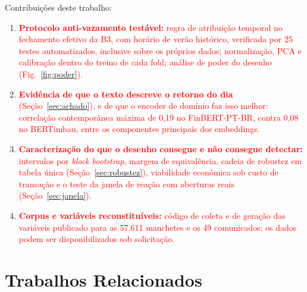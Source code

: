 \documentclass[conference]{IEEEtran}
\newcommand{\novo}[1]{\textcolor{red}{#1}}
\begin{document}
Contribui\c{c}\~oes deste trabalho:
\begin{enumerate}[\IEEEsetlabelwidth{(iii)}\renewcommand{\labelenumi}{\novo{(\roman{enumi})}}]
\item \novo{\textbf{Protocolo anti-vazamento test\'avel:} regra de atribui\c{c}\~ao temporal no fechamento efetivo da B3, com hor\'ario de ver\~ao hist\'orico, verificada por 25 testes automatizados, inclusive sobre os pr\'oprios dados; normaliza\c{c}\~ao, PCA e calibra\c{c}\~ao dentro do treino de cada fold; an\'alise de poder do desenho (Fig.~\ref{fig:poder}).}
\item \novo{\textbf{Evid\^encia de que o texto descreve o retorno do dia} (Se\c{c}\~ao~\ref{sec:achado}), e de que o encoder de dom\'inio faz isso melhor: correla\c{c}\~ao contempor\^anea m\'axima de 0,19 no FinBERT-PT-BR, contra 0,08 no BERTimbau, entre os componentes principais dos embeddings.}
\item \novo{\textbf{Caracteriza\c{c}\~ao do que o desenho consegue e n\~ao consegue detectar:} intervalos por \emph{block bootstrap}, margem de equival\^encia, cadeia de robustez em tabela \'unica (Se\c{c}\~ao~\ref{sec:robustez}), viabilidade econ\^omica sob custo de transa\c{c}\~ao e o teste da janela de rea\c{c}\~ao com aberturas reais (Se\c{c}\~ao~\ref{sec:janela}).}
\item \novo{\textbf{Corpus e vari\'aveis reconstitu\'iveis:} c\'odigo de coleta e de gera\c{c}\~ao das vari\'aveis publicado para as 57.611 manchetes e os 49 comunicados; os dados podem ser disponibilizados sob solicita\c{c}\~ao.}
\end{enumerate}

\section{Trabalhos Relacionados}
\label{sec:relacionados}
\end{document}
